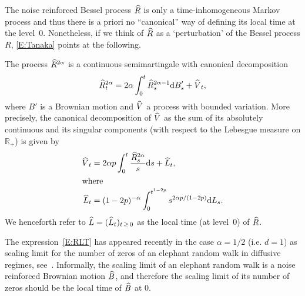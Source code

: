 \documentclass[AHL,Unicode,longabstracts,published]{cedram}
\renewcommand{\hat}[1]{\widehat{#1}}
\newcommand{\dd}{\mathrm{d}}
\newcommand{\R}{\mathbb{R}}
\let\oldhat\hat
\renewcommand*{\hat}[1]{\mathchoice{\widehat{#1}}{\widehat{#1}}{\oldhat{#1}}{\oldhat{#1}}}
\begin{document}
The noise reinforced Bessel process $\hat R$ is only a time-inhomogeneous Markov process and thus there is a priori no ``canonical'' way of defining its local time at the level~$0$. Nonetheless, if we think of $\hat R$ as a `perturbation' of the Bessel process $R$, \eqref{E:Tanaka} points at the following.


\begin{lemm} \label{L1}
The process $\hat R^{2\alpha}$ is a continuous semimartingale with canonical decomposition
\[
\hat R_t^{2\alpha}= 2\alpha \int_0^{t} \hat R^{2\alpha-1}_s \dd B'_s + \hat V_t,
\]
where $B'$ is a Brownian motion and $\hat V$ a process with bounded variation. More precisely, the canonical decomposition of $\hat V$ as the sum of its absolutely continuous and its singular components (with respect to the Lebesgue measure on $\R_+$) is given by
\begin{align}
\hat V_t &= 2\alpha p \int_0^{t} \frac{\hat R^{2\alpha}_s}{s} \dd s + \hat{L}_t,\nonumber
\\
\intertext{where}
\hat{L}_t &= (1-2p)^{-\alpha} \int_0^{t^{1-2p}} s^{2\alpha p/(1-2p)} \dd {L}_s.\label{E:RLT}
\end{align}
We henceforth refer to $\hat{L}=(\hat{L}_t)_{t\,\geq\,0}$ as the local time (at level~$0$) of $\hat R$.
\end{lemm}

\begin{rema}
The expression~\eqref{E:RLT} has appeared recently in the case $\alpha = 1/2$ (i.e. $d=1$) as scaling limit for the number of zeros of an elephant random walk in diffusive regimes, see~\cite[Theorem~3.1]{Zero}. Informally, the scaling limit of an elephant random walk is a noise reinforced Brownian motion $\hat B$, and therefore the scaling limit of its number of zeros should be the local time of $\hat B$ at $0$.
\end{rema}
\end{document}
